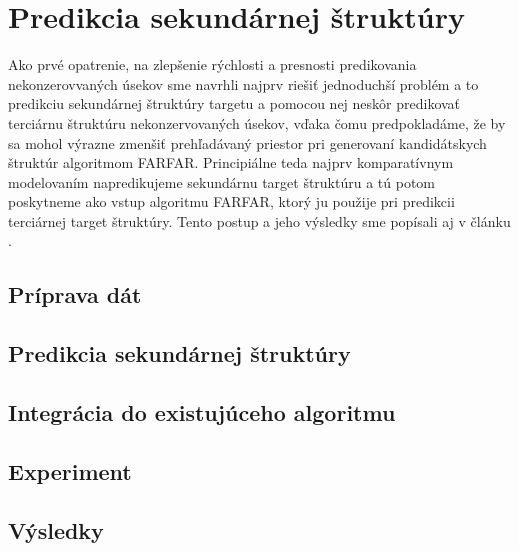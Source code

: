 \chapter{Predikcia sekundárnej štruktúry}

Ako prvé opatrenie, na zlepšenie rýchlosti a presnosti predikovania nekonzerovvaných úsekov sme navrhli najprv riešiť jednoduchší problém a to predikciu sekundárnej štruktúry targetu a pomocou nej neskôr predikovať terciárnu štruktúru nekonzervovaných úsekov, vďaka čomu predpokladáme, že by sa mohol výrazne zmenšiť prehľadávaný priestor pri generovaní kandidátskych štruktúr algoritmom FARFAR. Principiálne teda najprv komparatívnym modelovaním napredikujeme sekundárnu target štruktúru a tú potom poskytneme ako vstup algoritmu FARFAR, ktorý ju použije pri predikcii terciárnej target štruktúry. Tento postup a jeho výsledky sme popísali aj v článku \cite{8218009}.

\section{Príprava dát}



\section{Predikcia sekundárnej štruktúry}


\section{Integrácia do existujúceho algoritmu}


\section{Experiment}


\section{Výsledky}